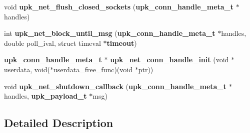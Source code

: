\begin{DoxyCompactItemize}
\item 
void {\bf upk\_\-net\_\-flush\_\-closed\_\-sockets} ({\bf upk\_\-conn\_\-handle\_\-meta\_\-t} $\ast$handles)
\item 
int {\bf upk\_\-net\_\-block\_\-until\_\-msg} ({\bf upk\_\-conn\_\-handle\_\-meta\_\-t} $\ast$handles, double poll\_\-ival, struct timeval $\ast${\bf timeout})
\item 
{\bf upk\_\-conn\_\-handle\_\-meta\_\-t} $\ast$ {\bf upk\_\-net\_\-conn\_\-handle\_\-init} (void $\ast$userdata, void($\ast$userdata\_\-free\_\-func)(void $\ast$ptr))
\item 
void {\bf upk\_\-net\_\-shutdown\_\-callback} ({\bf upk\_\-conn\_\-handle\_\-meta\_\-t} $\ast$handles, {\bf upk\_\-payload\_\-t} $\ast$msg)
\end{DoxyCompactItemize}


\subsection{Detailed Description}
